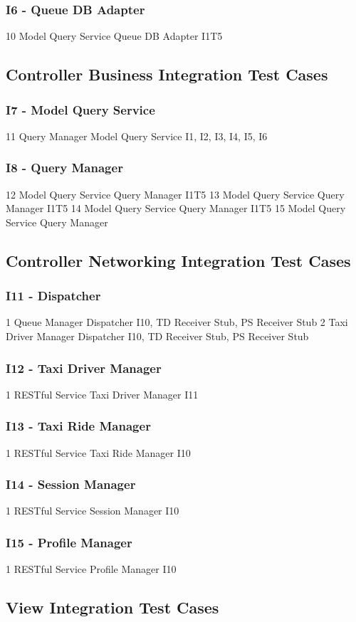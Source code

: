 \subsubsection{I6 - Queue DB Adapter}
\testCaseSimpleSimple
	{10}
	{Model Query Service}
	{Queue DB Adapter}
	{I1T5}
\subsection{Controller Business Integration Test Cases}
\subsubsection{I7 - Model Query Service}
\testCaseSimpleSimple
	{11}
	{Query Manager}
	{Model Query Service}
	{I1, I2, I3, I4, I5, I6}
\subsubsection{I8 - Query Manager}
\testCaseSimpleSimple
	{12}
	{Model Query Service}
	{Query Manager}
	{I1T5}
\testCaseSimpleSimple
	{13}
	{Model Query Service}
	{Query Manager}
	{I1T5}
\testCaseSimpleSimple
	{14}
	{Model Query Service}
	{Query Manager}
	{I1T5}
\testCaseSimpleSimple
	{15}
	{Model Query Service}
	{Query Manager}
	{}
\subsection{Controller Networking Integration Test Cases}
\subsubsection{I11 - Dispatcher}
\testCaseSimpleSimple
	{1}
	{Queue Manager}
	{Dispatcher}
	{I10, TD Receiver Stub, PS Receiver Stub}
\testCaseSimpleSimple
	{2}
	{Taxi Driver Manager}
	{Dispatcher}
	{I10, TD Receiver Stub, PS Receiver Stub}
\subsubsection{I12 - Taxi Driver Manager}
\testCaseSimpleSimple
	{1}
	{RESTful Service}
	{Taxi Driver Manager}
	{I11}
\subsubsection{I13 - Taxi Ride Manager}
\testCaseSimpleSimple
	{1}
	{RESTful Service}
	{Taxi Ride Manager}
	{I10}
\subsubsection{I14 - Session Manager}
\testCaseSimpleSimple
	{1}
	{RESTful Service}
	{Session Manager}
	{I10}
\subsubsection{I15 - Profile Manager}
\testCaseSimpleSimple
	{1}
	{RESTful Service}
	{Profile Manager}
	{I10}
\subsection{View Integration Test Cases}